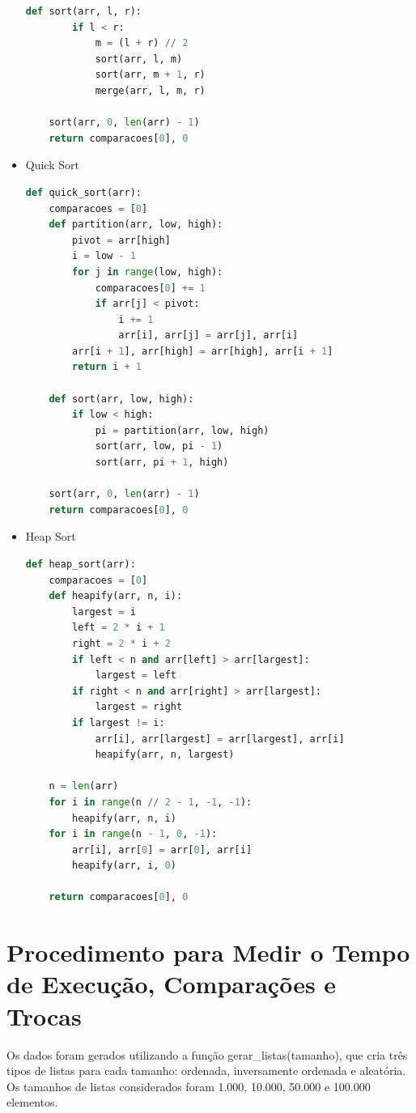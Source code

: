 \documentclass[tcc2]{uftex}
\begin{document}
\begin{itemize}
\begin{lstlisting}[language=python]
    def sort(arr, l, r):
        if l < r:
            m = (l + r) // 2
            sort(arr, l, m)
            sort(arr, m + 1, r)
            merge(arr, l, m, r)
    
    sort(arr, 0, len(arr) - 1)
    return comparacoes[0], 0


\end{lstlisting}

\item{Quick Sort}


\begin{lstlisting}[language=python]
def quick_sort(arr):
    comparacoes = [0]
    def partition(arr, low, high):
        pivot = arr[high]
        i = low - 1
        for j in range(low, high):
            comparacoes[0] += 1
            if arr[j] < pivot:
                i += 1
                arr[i], arr[j] = arr[j], arr[i]
        arr[i + 1], arr[high] = arr[high], arr[i + 1]
        return i + 1

    def sort(arr, low, high):
        if low < high:
            pi = partition(arr, low, high)
            sort(arr, low, pi - 1)
            sort(arr, pi + 1, high)
    
    sort(arr, 0, len(arr) - 1)
    return comparacoes[0], 0

\end{lstlisting}

\item{Heap Sort}


\begin{lstlisting}[language=python]
def heap_sort(arr):
    comparacoes = [0]
    def heapify(arr, n, i):
        largest = i
        left = 2 * i + 1
        right = 2 * i + 2
        if left < n and arr[left] > arr[largest]:
            largest = left
        if right < n and arr[right] > arr[largest]:
            largest = right
        if largest != i:
            arr[i], arr[largest] = arr[largest], arr[i]
            heapify(arr, n, largest)

    n = len(arr)
    for i in range(n // 2 - 1, -1, -1):
        heapify(arr, n, i)
    for i in range(n - 1, 0, -1):
        arr[i], arr[0] = arr[0], arr[i]
        heapify(arr, i, 0)

    return comparacoes[0], 0

\end{lstlisting}
\end{itemize}

\section{Procedimento para Medir o Tempo de Execução, Comparações e Trocas}
Os dados foram gerados utilizando a função gerar\_listas(tamanho), que cria três tipos de listas para cada tamanho: ordenada, inversamente ordenada e aleatória. Os tamanhos de listas considerados foram 1.000, 10.000, 50.000 e 100.000 elementos.
\end{document}

